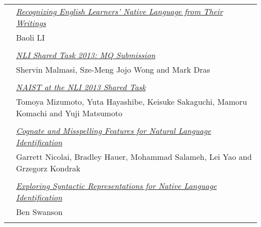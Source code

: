 \begin{tabular}{p{20mm}p{138mm}}
 & \hyperlink{page.119}{\em Recognizing English Learners’ Native Language from Their Writings}\\
         & Baoli LI \\
\\

 & \hyperlink{page.124}{\em NLI Shared Task 2013: MQ Submission}\\
         & Shervin Malmasi, Sze-Meng Jojo Wong and Mark Dras \\
\\

 & \hyperlink{page.134}{\em NAIST at the NLI 2013 Shared Task}\\
         & Tomoya Mizumoto, Yuta Hayashibe, Keisuke Sakaguchi, Mamoru Komachi and Yuji Matsumoto \\
\\

 & \hyperlink{page.140}{\em Cognate and Misspelling Features for Natural Language Identification}\\
         & Garrett Nicolai, Bradley Hauer, Mohammad Salameh, Lei Yao and Grzegorz Kondrak \\
\\

 & \hyperlink{page.146}{\em Exploring Syntactic Representations for Native Language Identification}\\
         & Ben Swanson \\
\\

\end{tabular}
\newpage
